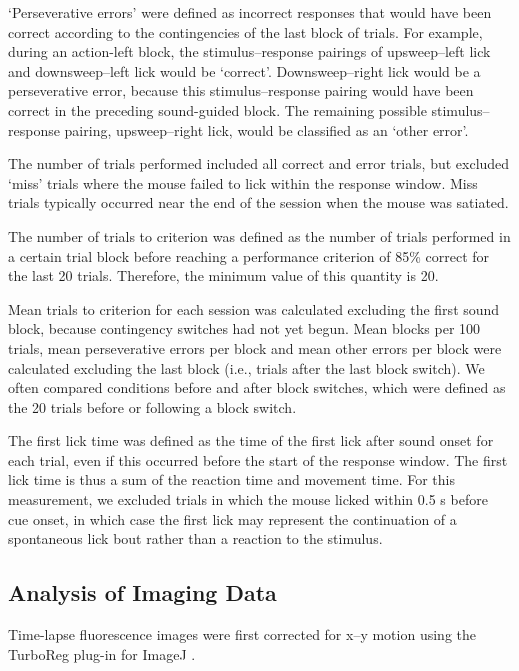 `Perseverative errors' were defined as incorrect responses that would have been correct according to the contingencies of the last block of trials. For example, during an action-left block, the stimulus–response pairings of upsweep–left lick and downsweep–left lick would be `correct'. Downsweep–right lick would be a perseverative error, because this stimulus–response pairing would have been correct in the preceding sound-guided block. The remaining possible stimulus–response pairing, upsweep–right lick, would be classified as an `other error'. 

The number of trials performed included all correct and error trials, but excluded `miss' trials where the mouse failed to lick within the response window. Miss trials typically occurred near the end of the session when the mouse was satiated. 

The number of trials to criterion was defined as the number of trials performed in a certain trial block before reaching a performance criterion of 85\% correct for the last 20 trials. Therefore, the minimum value of this quantity is 20. 

Mean trials to criterion for each session was calculated excluding the first sound block, because contingency switches had not yet begun. Mean blocks per 100 trials, mean perseverative errors per block and mean other errors per block were calculated excluding the last block (i.e., trials after the last block switch). We often compared conditions before and after block switches, which were defined as the 20 trials before or following a block switch. 

The first lick time was defined as the time of the first lick after sound onset for each trial, even if this occurred before the start of the response window. The first lick time is thus a sum of the reaction time and movement time. For this measurement, we excluded trials in which the mouse licked within 0.5 s before cue onset, in which case the first lick may represent the continuation of a spontaneous lick bout rather than a reaction to the stimulus.

\subsection*{Analysis of Imaging Data}
Time-lapse fluorescence images were first corrected for x–y motion using the TurboReg plug-in \citep{thevenaz1998pyramid} for ImageJ \citep{schneider2012nih}. 

